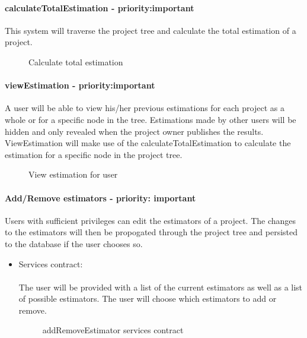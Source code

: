 	\paragraph{calculateTotalEstimation - priority:important}This system will traverse the project tree and calculate the total estimation of a project.
	\begin{figure}[H]
	    	\centering
	    	\caption{Calculate total estimation}
	    	\label{fig:Estimation_calculateTotalEstimation.png}
   	\end{figure}

	\paragraph{viewEstimation - priority:important}A user will be able to view his/her previous estimations for each project as a whole or for a specific node in the tree. Estimations made by other users will be hidden and only revealed when the project owner publishes the results. ViewEstimation will make use of the calculateTotalEstimation to calculate the estimation for a specific node in the project tree.
	\begin{figure}[H]
	    	\centering
	    	\caption{View estimation for user}
	    	\label{fig:Estimation_viewEstimation.png}
   	\end{figure}

	\paragraph{Add/Remove estimators - priority: important}
	Users with sufficient privileges can edit the estimators of a project. The changes to the estimators will then be propogated through the project tree and persisted to the database if the user chooses so.

	\begin{itemize}
		\item Services contract:\\ \\
		The user will be provided with a list of the current estimators as well as a list of possible estimators. The user will choose which estimators to add or remove.
		\begin{figure}[H]
	    	\centering
	    	\caption{addRemoveEstimator services contract}
	    	\label{fig:addremove_estimators_services_contract}
	   	\end{figure}
	\end{itemize}


